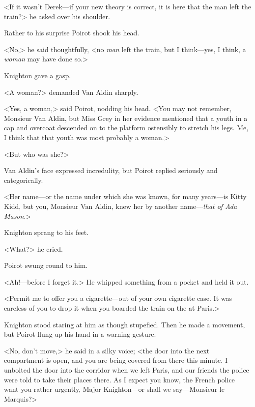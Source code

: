 <If it wasn't Derek—if your new theory is correct, it is here that the man left the train?> he asked over his shoulder.

Rather to his surprise Poirot shook his head.

<No,> he said thoughtfully, <no \emph{man} left the train, but I think—yes, I think, a \emph{woman} may have done so.>

Knighton gave a gasp.

<A woman?> demanded Van Aldin sharply.

<Yes, a woman,> said Poirot, nodding his head. <You may not remember, Monsieur Van Aldin, but Miss Grey in her evidence mentioned that a youth in a cap and overcoat descended on to the platform ostensibly to stretch his legs. Me, I think that that youth was most probably a woman.>

<But who was she?>

Van Aldin's face expressed incredulity, but Poirot replied seriously and categorically.

<Her name—or the name under which she was known, for many years—is Kitty Kidd, but you, Monsieur Van Aldin, knew her by another name—\emph{that of Ada Mason}.>

Knighton sprang to his feet.

<What?> he cried.

Poirot swung round to him.

<Ah!—before I forget it.> He whipped something from a pocket and held it out.

<Permit me to offer you a cigarette—out of your own cigarette case. It was careless of you to drop it when you boarded the train on the  at Paris.>

Knighton stood staring at him as though stupefied. Then he made a movement, but Poirot flung up his hand in a warning gesture.

<No, don't move,> he said in a silky voice; <the door into the next compartment is open, and you are being covered from there this minute. I unbolted the door into the corridor when we left Paris, and our friends the police were told to take their places there. As I expect you know, the French police want you rather urgently, Major Knighton—or shall we say—Monsieur le Marquis?>